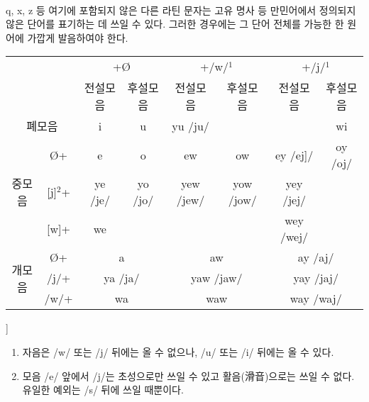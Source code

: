 \documentclass{book}
\begin{document}
    \paragraph{}
    q, x, z 등 여기에 포함되지 않은 다른 라틴 문자는 고유 명사 등 만민어에서 정의되지 않은 단어를 표기하는 데 쓰일 수 있다. 그러한 경우에는 그 단어 전체를 가능한 한 원어에 가깝게 발음하여야 한다.
    
    \footnotesize{}\begin{center}
    \begin{tabular}{ | c | c | c | c | c | c | c | c | } \hline
    \multicolumn{2}{|c|}{\multirow{2}{*}{}} & \multicolumn{2}{|c|}{+\O} & \multicolumn{2}{|c|}{+/w/$^1$} & \multicolumn{2}{|c|}{+/j/$^1$} \\ \cline{3-8}
    \multicolumn{2}{|c|}{} & 전설모음 & 후설모음 & 전설모음 & 후설모음 & 전설모음 & 후설모음 \\ \hline
    \multicolumn{2}{|c|}{폐모음} & i & u & yu /ju/ & & & wi \\ \hline
    \multirow{3}{*}{중모음} & \O+ & e & o & ew & ow & ey /ej]/& oy /oj/ \\ \cline{2-8}
    & [j]$^2$+ & ye /je/ & yo /jo/ & yew /jew/ & yow /jow/ & yey /jej/ &  \\ \cline{2-8}
    & [w]+ & we & & & & wey /wej/ & \\ \hline
    \multirow{3}{*}{개모음} & \O+ & \multicolumn{2}{|c|}{a} & \multicolumn{2}{|c|}{aw} & \multicolumn{2}{|c|}{ay /aj/} \\ \cline{2-8}
    & /j/+ & \multicolumn{2}{|c|}{ya /ja/} & \multicolumn{2}{|c|}{yaw /jaw/} & \multicolumn{2}{|c|}{yay /jaj/} \\ \cline{2-8}
    & /w/+ & \multicolumn{2}{|c|}{wa} & \multicolumn{2}{|c|}{waw} & \multicolumn{2}{|c|}{way /waj/} \\ \hline
    
    
    \end{tabular}
    \end{center}]{}
    \begin{enumerate}
      \item 자음은 /w/ 또는 /j/ 뒤에는 올 수 없으나, /u/ 또는 /i/ 뒤에는 올 수 있다.
      \item 모음 /e/ 앞에서 /j/는 초성으로만 쓰일 수 있고 활음(滑音)으로는 쓰일 수 없다. 유일한 예외는 /s/ 뒤에 쓰일 때뿐이다.
      
    \end{enumerate}
    \normalsize{}
\end{document}
